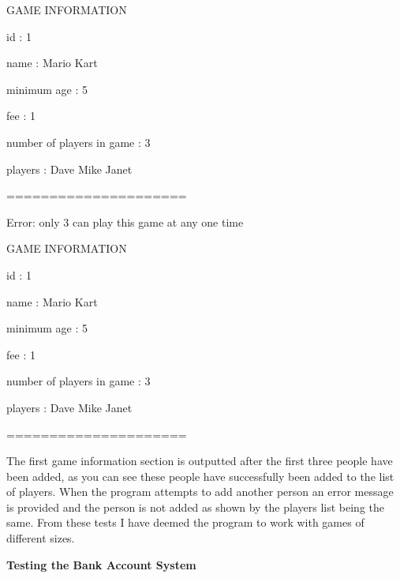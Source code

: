 \documentclass[a4paper]{article}
\begin{document}
\noindent GAME INFORMATION

\noindent id : 1

\noindent name : Mario Kart

\noindent minimum age : 5

\noindent fee : 1

\noindent number of players in game : 3

\noindent players : Dave Mike Janet 

\noindent =====================

\noindent Error: only 3 can play this game at any one time

\noindent GAME INFORMATION

\noindent id : 1

\noindent name : Mario Kart

\noindent minimum age : 5

\noindent fee : 1

\noindent number of players in game : 3

\noindent players : Dave Mike Janet 

\noindent =====================\newline

The first game information section is outputted after the first three people have been added, as you can see these people have successfully been added to the list of players. When the program attempts to add another person an error message is provided and the person is not added as shown by the players list being the same. From these tests I have deemed the program to work with games of different sizes. \newline

\noindent \textbf{Testing the Bank Account System}
\end{document}

